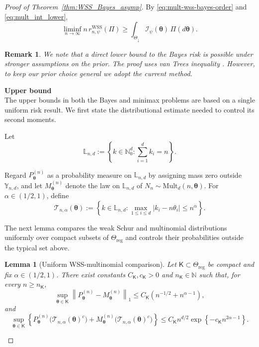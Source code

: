 \documentclass{article}
\newtheorem{lemma}[theorem]{Lemma}
\newtheorem{remark}{Remark}
\theoremstyle{named}
\theoremstyle{named1}
\newcommand{\WSS}{\mathrm{WSS}}
\newcommand{\Mult}{\mathrm{Mult}}
\newcommand{\btheta}{\boldsymbol{\theta}}
\newcommand{\cI}{\mathcal{I}}
\theoremstyle{plain}
\theoremstyle{remark}
\begin{document}
\begin{proof}[Proof of Theorem~\ref{thm:WSS_Bayes_asymp}]
By \eqref{eq:mult-wss-bayes-order} and
\eqref{eq:mult_int_lower},
\begin{equation}
    \liminf_{n\to\infty}
    n\,r_{n,\psi}^{\WSS}(\Pi)
    \geq
    \int_{\Theta_{\downarrow}}
      \cI_\psi(\btheta)\,\Pi(d\btheta).
\label{eq:wss-bayes-lower-bound}
\end{equation}

\begin{remark}
    We note that a direct lower bound to the Bayes risk is possible under stronger assumptions on the prior. The proof uses van Trees inequality \cite{Gill&Levit}. However, to keep our prior choice general we adopt the current method.
\end{remark}

\textbf{Upper bound}\\

The upper bounds in both the Bayes and minimax problems are based on a
single uniform risk result. We first state the distributional estimate
needed to control its second moments.

Let
\[
    \mathbb L_{n,d}
    :=
    \left\{
        k\in\mathbb N_0^d:
        \sum_{i=1}^d k_i=n
    \right\}.
\]


Regard \(P_{\btheta}^{(n)}\) as a probability measure on
\(\mathbb L_{n,d}\) by assigning mass zero outside
\(\mathbb Y_{n,d}\), and let \(M_{\btheta}^{(n)}\) denote the law on
\(\mathbb L_{n,d}\) of \(N_n\sim\Mult_d(n,\btheta)\). For
\(\alpha\in(1/2,1)\), define
\[
    \mathcal T_{n,\alpha}(\btheta)
    :=\left\{k\in\mathbb L_{n,d}:
      \max_{1\leq i\leq d}|k_i-n\theta_i|\leq n^\alpha
    \right\}.
\]

The next lemma compares the weak Schur and multinomial distributions
uniformly over compact subsets of $\Theta_{\mathrm{reg}}$ and
controls their probabilities outside the typical set above.
\begin{lemma}[Uniform WSS-multinomial comparison]
\label{lem:uniform-wss-mult-comparison}
Let $\mathsf K\subset\Theta_{\mathrm{reg}}$ be compact and fix
$\alpha\in(1/2,1)$. There exist constants
$C_{\mathsf K},c_{\mathsf K}>0$ and
$n_{\mathsf K}\in\mathbb N$ such that, for every
$n\geq n_{\mathsf K}$,
\begin{equation}
\label{eq:uniform-l1-comparison}
\sup_{\btheta\in\mathsf K}
\left\|
    P_{\btheta}^{(n)}-M_{\btheta}^{(n)}
\right\|_1
\leq
C_{\mathsf K}
\left(
    n^{-1/2}+n^{\alpha-1}
\right),
\end{equation}
and
\begin{equation}
\label{eq:uniform-typical-tail}
\sup_{\btheta\in\mathsf K}
\left\{
    P_{\btheta}^{(n)}
    \bigl(\mathcal T_{n,\alpha}(\btheta)^c\bigr)
    +
    M_{\btheta}^{(n)}
    \bigl(\mathcal T_{n,\alpha}(\btheta)^c\bigr)
\right\}
\leq
C_{\mathsf K}n^{d/2}
\exp\!\left\{
    -c_{\mathsf K}n^{2\alpha-1}
\right\}.
\end{equation}
\end{lemma}


\end{proof}
\end{document}
